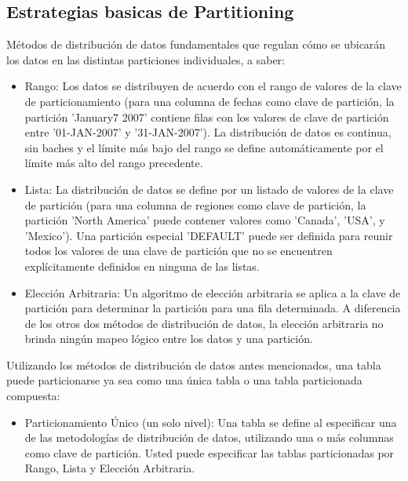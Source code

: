 \documentclass{article}
\begin{document}
\begin{multicols}{2}
\subsection{Estrategias basicas de Partitioning}
Métodos de distribución de datos fundamentales que regulan cómo se
ubicarán los datos en las distintas particiones individuales, a saber:
\begin{itemize}
    \item Rango: Los datos se distribuyen de acuerdo con el rango de valores de la clave de
          particionamiento (para una columna de fechas como clave de partición, la partición 'January7
          2007' contiene filas con los valores de clave de partición entre '01-JAN-2007' y '31-JAN-2007').
          La distribución de datos es continua, sin baches y el límite más bajo del rango se define
          automáticamente por el límite más alto del rango precedente.
    \item Lista: La distribución de datos se define por un listado de valores de la clave de partición (para
          una columna de regiones como clave de partición, la partición 'North America' puede contener
          valores como 'Canada', 'USA', y 'Mexico'). Una partición especial 'DEFAULT' puede ser
          definida para reunir todos los valores de una clave de partición que no se encuentren
          explícitamente definidos en ninguna de las listas. 
    \item Elección Arbitraria: Un algoritmo de elección arbitraria se aplica a la clave de partición para
          determinar la partición para una fila determinada. A diferencia de los otros dos métodos de
          distribución de datos, la elección arbitraria no brinda ningún mapeo lógico entre los datos y una
          partición. 
\end{itemize}
Utilizando los métodos de distribución de datos antes mencionados, una tabla puede particionarse ya sea
como una única tabla o una tabla particionada compuesta:
\begin{itemize}
    \item Particionamiento Único (un solo nivel): Una tabla se define al especificar una de las
          metodologías de distribución de datos, utilizando una o más columnas como clave de partición.
          Usted puede especificar las tablas particionadas por Rango, Lista y Elección Arbitraria. 
          

\end{itemize}
\end{multicols}
\end{document}
